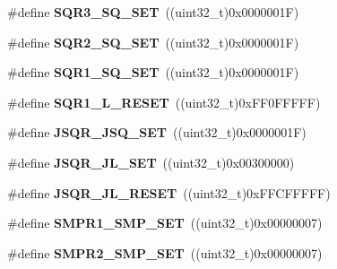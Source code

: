 \begin{DoxyCompactItemize}
\item 
\hypertarget{group___a_d_c_gaaed9be4552724197505e5e4d23fcf7df}{\#define {\bfseries S\-Q\-R3\-\_\-\-S\-Q\-\_\-\-S\-E\-T}~((uint32\-\_\-t)0x0000001\-F)}\label{group___a_d_c_gaaed9be4552724197505e5e4d23fcf7df}

\item 
\hypertarget{group___a_d_c_ga39495128596ac3def40413414272f661}{\#define {\bfseries S\-Q\-R2\-\_\-\-S\-Q\-\_\-\-S\-E\-T}~((uint32\-\_\-t)0x0000001\-F)}\label{group___a_d_c_ga39495128596ac3def40413414272f661}

\item 
\hypertarget{group___a_d_c_ga72ecdac96f13a034c41f1e7f8ce3b45c}{\#define {\bfseries S\-Q\-R1\-\_\-\-S\-Q\-\_\-\-S\-E\-T}~((uint32\-\_\-t)0x0000001\-F)}\label{group___a_d_c_ga72ecdac96f13a034c41f1e7f8ce3b45c}

\item 
\hypertarget{group___a_d_c_gaf7266f2602d12f1dca080669583aea4f}{\#define {\bfseries S\-Q\-R1\-\_\-\-L\-\_\-\-R\-E\-S\-E\-T}~((uint32\-\_\-t)0x\-F\-F0\-F\-F\-F\-F\-F)}\label{group___a_d_c_gaf7266f2602d12f1dca080669583aea4f}

\item 
\hypertarget{group___a_d_c_gac4cf4825da426e3ecdb87967854c834e}{\#define {\bfseries J\-S\-Q\-R\-\_\-\-J\-S\-Q\-\_\-\-S\-E\-T}~((uint32\-\_\-t)0x0000001\-F)}\label{group___a_d_c_gac4cf4825da426e3ecdb87967854c834e}

\item 
\hypertarget{group___a_d_c_gaaee3ea0188e1d2b30d6d0e0a211c630d}{\#define {\bfseries J\-S\-Q\-R\-\_\-\-J\-L\-\_\-\-S\-E\-T}~((uint32\-\_\-t)0x00300000)}\label{group___a_d_c_gaaee3ea0188e1d2b30d6d0e0a211c630d}

\item 
\hypertarget{group___a_d_c_gaf129b56688ca71eb3a54f8d513f40067}{\#define {\bfseries J\-S\-Q\-R\-\_\-\-J\-L\-\_\-\-R\-E\-S\-E\-T}~((uint32\-\_\-t)0x\-F\-F\-C\-F\-F\-F\-F\-F)}\label{group___a_d_c_gaf129b56688ca71eb3a54f8d513f40067}

\item 
\hypertarget{group___a_d_c_ga844e95644b6b0ce035db737cf6a2f3ef}{\#define {\bfseries S\-M\-P\-R1\-\_\-\-S\-M\-P\-\_\-\-S\-E\-T}~((uint32\-\_\-t)0x00000007)}\label{group___a_d_c_ga844e95644b6b0ce035db737cf6a2f3ef}

\item 
\hypertarget{group___a_d_c_ga13b8e9e5253f17d6f1d6e68a6feb8947}{\#define {\bfseries S\-M\-P\-R2\-\_\-\-S\-M\-P\-\_\-\-S\-E\-T}~((uint32\-\_\-t)0x00000007)}\label{group___a_d_c_ga13b8e9e5253f17d6f1d6e68a6feb8947}


\end{DoxyCompactItemize}
